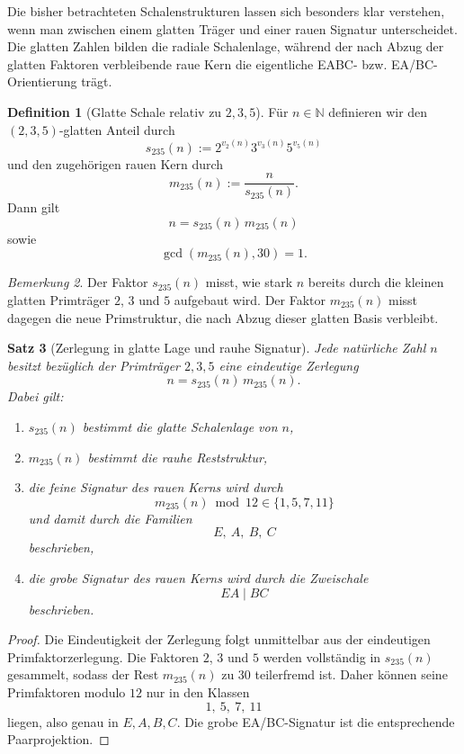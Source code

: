 \documentclass[11pt,a4paper]{article}
\newtheorem{satz}{Satz}
\theoremstyle{definition}
\newtheorem{definition}[satz]{Definition}
\theoremstyle{remark}
\newtheorem{bemerkung}[satz]{Bemerkung}
\begin{document}
	Die bisher betrachteten Schalenstrukturen lassen sich besonders klar verstehen, wenn man
	zwischen einem glatten Träger und einer rauen Signatur unterscheidet. Die glatten Zahlen
	bilden die radiale Schalenlage, während der nach Abzug der glatten Faktoren verbleibende
	raue Kern die eigentliche EABC- bzw. EA/BC-Orientierung trägt.
	
	\begin{definition}[Glatte Schale relativ zu \(2,3,5\)]
		Für \(n\in\mathbb N\) definieren wir den \((2,3,5)\)-glatten Anteil durch
		\[
		s_{235}(n):=2^{v_2(n)}3^{v_3(n)}5^{v_5(n)}
		\]
		und den zugehörigen rauen Kern durch
		\[
		m_{235}(n):=\frac{n}{s_{235}(n)}.
		\]
		Dann gilt
		\[
		n=s_{235}(n)\,m_{235}(n)
		\]
		sowie
		\[
		\gcd(m_{235}(n),30)=1.
		\]
	\end{definition}
	
	\begin{bemerkung}
		Der Faktor \(s_{235}(n)\) misst, wie stark \(n\) bereits durch die kleinen glatten
		Primträger \(2\), \(3\) und \(5\) aufgebaut wird. Der Faktor \(m_{235}(n)\) misst
		dagegen die neue Primstruktur, die nach Abzug dieser glatten Basis verbleibt.
	\end{bemerkung}
	
	\begin{satz}[Zerlegung in glatte Lage und rauhe Signatur]
		\label{satz:glatt_rau}
		Jede natürliche Zahl \(n\) besitzt bezüglich der Primträger \(2,3,5\) eine eindeutige
		Zerlegung
		\[
		\boxed{
			n=s_{235}(n)\,m_{235}(n).
		}
		\]
		Dabei gilt:
		
		\begin{enumerate}
			\item \(s_{235}(n)\) bestimmt die glatte Schalenlage von \(n\),
			\item \(m_{235}(n)\) bestimmt die rauhe Reststruktur,
			\item die feine Signatur des rauen Kerns wird durch
			\[
			m_{235}(n)\bmod 12 \in \{1,5,7,11\}
			\]
			und damit durch die Familien
			\[
			E,\ A,\ B,\ C
			\]
			beschrieben,
			\item die grobe Signatur des rauen Kerns wird durch die Zweischale
			\[
			EA\mid BC
			\]
			beschrieben.
		\end{enumerate}
	\end{satz}
	
	\begin{proof}
		Die Eindeutigkeit der Zerlegung folgt unmittelbar aus der eindeutigen Primfaktorzerlegung.
		Die Faktoren \(2\), \(3\) und \(5\) werden vollständig in \(s_{235}(n)\) gesammelt, sodass
		der Rest \(m_{235}(n)\) zu \(30\) teilerfremd ist. Daher können seine Primfaktoren modulo
		\(12\) nur in den Klassen
		\[
		1,\ 5,\ 7,\ 11
		\]
		liegen, also genau in \(E,A,B,C\). Die grobe EA/BC-Signatur ist die entsprechende
		Paarprojektion.
	\end{proof}
	
\end{document}
